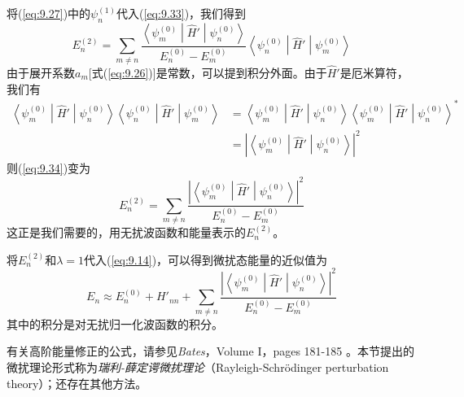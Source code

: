     将(\ref{eq:9.27})中的$\psi_n^{\left(1\right)}$代入(\ref{eq:9.33})，我们得到
    \begin{equation}
        E_n^{\left(2\right)} = \sum_{m \neq n} \frac{\left\langle \psi_m^{\left(0\right)} \middle| \hat{H}' \middle| \psi_n^{\left(0\right)} \right\rangle}{E_n^{\left(0\right)} - E_m^{\left(0\right)}} \left\langle \psi_n^{\left(0\right)} \middle| \hat{H}' \middle| \psi_m^{\left(0\right)} \right\rangle
        \label{eq:9.34}
    \end{equation}
    由于展开系数$a_m$[式(\ref{eq:9.26})]是常数，可以提到积分外面。由于$\hat{H}'$是厄米算符，我们有
    \begin{equation*}
        \begin{aligned}
            \left\langle \psi_m^{\left(0\right)} \middle| \hat{H}' \middle| \psi_n^{\left(0\right)} \right\rangle \left\langle \psi_n^{\left(0\right)} \middle| \hat{H}' \middle| \psi_m^{\left(0\right)} \right\rangle &= \left\langle \psi_m^{\left(0\right)} \middle| \hat{H}' \middle| \psi_n^{\left(0\right)} \right\rangle \left\langle \psi_m^{\left(0\right)} \middle| \hat{H}' \middle| \psi_n^{\left(0\right)} \right\rangle^{\ast} \\
            &= \left|\left\langle \psi_m^{\left(0\right)} \middle| \hat{H}' \middle| \psi_n^{\left(0\right)} \right\rangle\right|^2
        \end{aligned}
    \end{equation*}
    则(\ref{eq:9.34})变为
    \begin{equation}
        E_n^{\left(2\right)} = \sum_{m \neq n} \frac{\left|\left\langle \psi_m^{\left(0\right)} \middle| \hat{H}' \middle| \psi_n^{\left(0\right)} \right\rangle\right|^2}{E_n^{\left(0\right)} - E_m^{\left(0\right)}}
        \label{eq:9.35}
    \end{equation}
    这正是我们需要的，用无扰波函数和能量表示的$E_n^{\left(2\right)}$。

    将$E_n^{\left(2\right)}$和$\lambda=1$代入(\ref{eq:9.14})，可以得到微扰态能量的近似值为
    \begin{equation}
        E_n \approx E_n^{\left(0\right)} + H'_{nn} + \sum_{m \neq n} \frac{\left|\left\langle \psi_m^{\left(0\right)} \middle| \hat{H}' \middle| \psi_n^{\left(0\right)} \right\rangle\right|^2}{E_n^{\left(0\right)} - E_m^{\left(0\right)}}
        \label{eq:9.36}
    \end{equation}
    其中的积分是对无扰归一化波函数的积分。

    有关高阶能量修正的公式，请参见\textit{Bates}，Volume I，pages 181-185 。本节提出的微扰理论形式称为\textit{瑞利-薛定谔微扰理论}（Rayleigh-Schrödinger perturbation theory）；还存在其他方法。

